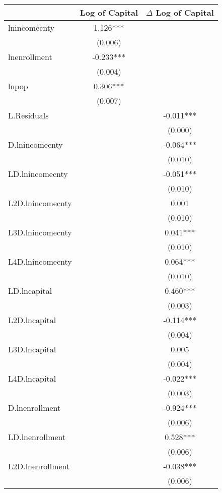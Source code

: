 \begin{tabular}{lcc}
\hline
 & Log of Capital & $\Delta$ Log of Capital \\ 
\hline
lnincomecnty        & 1.126*** &  \\
                    & (0.006)  &  \\
lnenrollment        & -0.233*** &  \\
                    & (0.004)  &  \\
lnpop               & 0.306*** &  \\
                    & (0.007)  &  \\
L.Residuals         &  & -0.011*** \\
                    &  & (0.000) \\
D.lnincomecnty      &  & -0.064*** \\
                    &  & (0.010) \\
LD.lnincomecnty     &  & -0.051*** \\
                    &  & (0.010) \\
L2D.lnincomecnty    &  & 0.001 \\
                    &  & (0.010) \\
L3D.lnincomecnty    &  & 0.041*** \\
                    &  & (0.010) \\
L4D.lnincomecnty    &  & 0.064*** \\
                    &  & (0.010) \\
LD.lncapital        &  & 0.460*** \\
                    &  & (0.003) \\
L2D.lncapital       &  & -0.114*** \\
                    &  & (0.004) \\
L3D.lncapital       &  & 0.005 \\
                    &  & (0.004) \\
L4D.lncapital       &  & -0.022*** \\
                    &  & (0.003) \\
D.lnenrollment      &  & -0.924*** \\
                    &  & (0.006) \\
LD.lnenrollment     &  & 0.528*** \\
                    &  & (0.006) \\
L2D.lnenrollment    &  & -0.038*** \\
                    &  & (0.006) \\

\end{tabular}
